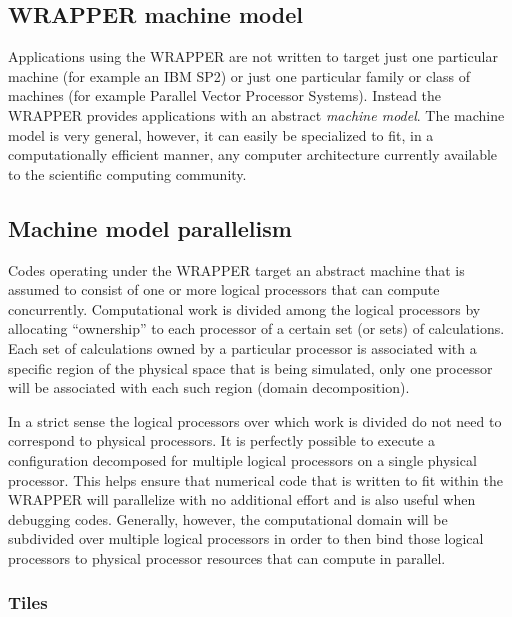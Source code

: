 \subsection{WRAPPER machine model}

Applications using the WRAPPER are not written to target just one 
particular machine (for example an IBM SP2) or just one particular family or 
class of machines (for example Parallel Vector Processor Systems). Instead the
WRAPPER provides applications with an 
abstract {\it machine model}. The machine model is very general, however, it can
easily be specialized to fit, in a computationally efficient manner, any 
computer architecture currently available to the scientific computing community.

\subsection{Machine model parallelism}

 Codes operating under the WRAPPER target an abstract machine that is assumed to
consist of one or more logical processors that can compute concurrently.  
Computational work is divided among the logical
processors by allocating ``ownership'' to 
each processor of a certain set (or sets) of calculations. Each set of 
calculations owned by a particular processor is associated with a specific 
region of the physical space that is being simulated, only one processor will 
be associated with each such region (domain decomposition).  

In a strict sense the logical processors over which work is divided do not need 
to correspond to physical processors. It is perfectly possible to execute a 
configuration decomposed for multiple logical processors on a single physical 
processor. This helps ensure that numerical code that is written to fit
within the WRAPPER will parallelize with no additional effort and is
also useful when debugging codes. Generally, however,
the computational domain will be subdivided over multiple logical
processors in order to then bind those logical processors to physical 
processor resources that can compute in parallel.

\subsubsection{Tiles}

